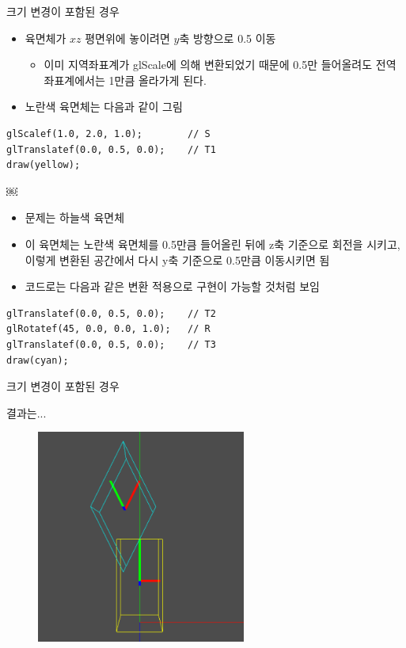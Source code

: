 \documentclass{beamer}
\begin{document}
\begin{frame}[fragile]{크기 변경이 포함된 경우}

\begin{itemize}
\item 육면체가 $xz$ 평면위에 놓이려면 $y$축 방향으로 0.5 이동
	\begin{itemize}
	\item 이미 지역좌표계가 {\sf glScale}에 의해 변환되었기 때문에 0.5만 들어올려도 전역좌표계에서는 1만큼 올라가게 된다.
	\end{itemize}
\item 노란색 육면체는 다음과 같이 그림
\end{itemize}

\lstset{language=C++, escapechar=^} 
\begin{lstlisting}
glScalef(1.0, 2.0, 1.0);		// S
glTranslatef(0.0, 0.5, 0.0);	// T1
draw(yellow);
\end{lstlisting}

￼
\begin{itemize}
\item 문제는 하늘색 육면체
\item 이 육면체는 노란색 육면체를 0.5만큼 들어올린 뒤에 z축 기준으로 회전을 시키고, 이렇게 변환된 공간에서 다시 y축 기준으로 0.5만큼 이동시키면 됨
\item 코드로는 다음과 같은 변환 적용으로 구현이 가능할 것처럼 보임
\end{itemize}

\lstset{language=C++, escapechar=^} 
\begin{lstlisting}
glTranslatef(0.0, 0.5, 0.0);	// T2
glRotatef(45, 0.0, 0.0, 1.0);	// R
glTranslatef(0.0, 0.5, 0.0);	// T3
draw(cyan);
\end{lstlisting}

\end{frame}

\begin{frame}[fragile]{크기 변경이 포함된 경우}

결과는...

\begin{figure}
    \includegraphics[height=7cm]{OGL_transform/scale.png}
\end{figure}

\end{frame}
\end{document}
